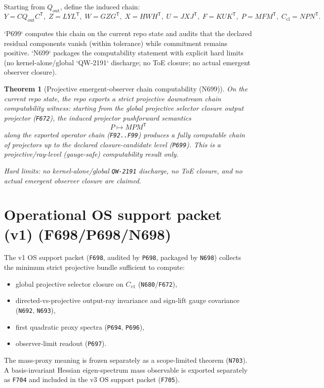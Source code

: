 \documentclass[11pt,a4paper]{article}
\newtheorem{theorem}{Theorem}[section]
\begin{document}
Starting from $Q_{\mathrm{out}}$, define the induced chain:
\[
Y=C Q_{\mathrm{out}} C^{\mathsf T},\;
Z=L Y L^{\mathsf T},\;
W=G Z G^{\mathsf T},\;
X=H W H^{\mathsf T},\;
U=J X J^{\mathsf T},\;
F=K U K^{\mathsf T},\;
P=M F M^{\mathsf T},\;
C_{\mathrm{cl}}=N P N^{\mathsf T}.
\]

`P699` computes this chain on the current repo state and audits that the declared residual components vanish (within tolerance) while commitment remains positive.
`N699` packages the computability statement with explicit hard limits (no kernel-alone/global `QW-2191` discharge; no ToE closure; no actual emergent observer closure).

\begin{theorem}[Projective emergent-observer chain computability (N699)]
On the current repo state, the repo exports a strict projective downstream chain computability witness:
starting from the global projective selector closure output projector (\texttt{F672}), the induced projector pushforward semantics
\[
P \mapsto MPM^{\mathsf T}
\]
along the exported operator chain (\texttt{F92..F99}) produces a fully computable chain of projectors up to the declared closure-candidate level (\texttt{P699}).
This is a projective/ray-level (gauge-safe) computability result only.

\emph{Hard limits:} no kernel-alone/global \texttt{QW-2191} discharge, no ToE closure, and no actual emergent observer closure are claimed.
\end{theorem}
\section{Operational OS support packet (v1) (F698/P698/N698)}

The v1 OS support packet (\texttt{F698}, audited by \texttt{P698}, packaged by \texttt{N698}) collects the minimum strict projective bundle sufficient to compute:
\begin{itemize}
  \item global projective selector closure on $C_{v1}$ (\texttt{N680}/\texttt{F672}),
  \item directed-vs-projective output-ray invariance and sign-lift gauge covariance (\texttt{N692}, \texttt{N693}),
  \item first quadratic proxy spectra (\texttt{P694}, \texttt{P696}),
  \item observer-limit readout (\texttt{P697}).
\end{itemize}
The mass-proxy meaning is frozen separately as a scope-limited theorem (\texttt{N703}). A basis-invariant Hessian eigen-spectrum mass observable is exported separately
as \texttt{F704} and included in the v3 OS support packet (\texttt{F705}).
\end{document}
